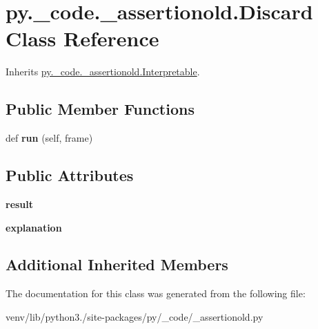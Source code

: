 \hypertarget{classpy_1_1__code_1_1__assertionold_1_1_discard}{}\section{py.\+\_\+code.\+\_\+assertionold.\+Discard Class Reference}
\label{classpy_1_1__code_1_1__assertionold_1_1_discard}


Inherits \hyperlink{classpy_1_1__code_1_1__assertionold_1_1_interpretable}{py.\+\_\+code.\+\_\+assertionold.\+Interpretable}.

\subsection*{Public Member Functions}
\begin{DoxyCompactItemize}
\item 
\mbox{\label{classpy_1_1__code_1_1__assertionold_1_1_discard_a133f28542759c7208a2f40fcdcc139ec}} 
def {\bfseries run} (self, frame)
\end{DoxyCompactItemize}
\subsection*{Public Attributes}
\begin{DoxyCompactItemize}
\item 
\mbox{\label{classpy_1_1__code_1_1__assertionold_1_1_discard_a6c4282189ec522a1e2766d8f935f3c8f}} 
{\bfseries result}
\item 
\mbox{\label{classpy_1_1__code_1_1__assertionold_1_1_discard_a09b3459b101e82e908307d81a9f9a4e6}} 
{\bfseries explanation}
\end{DoxyCompactItemize}
\subsection*{Additional Inherited Members}


The documentation for this class was generated from the following file\+:\begin{DoxyCompactItemize}
\item 
venv/lib/python3./site-\/packages/py/\+\_\+code/\+\_\+assertionold.\+py\end{DoxyCompactItemize}

